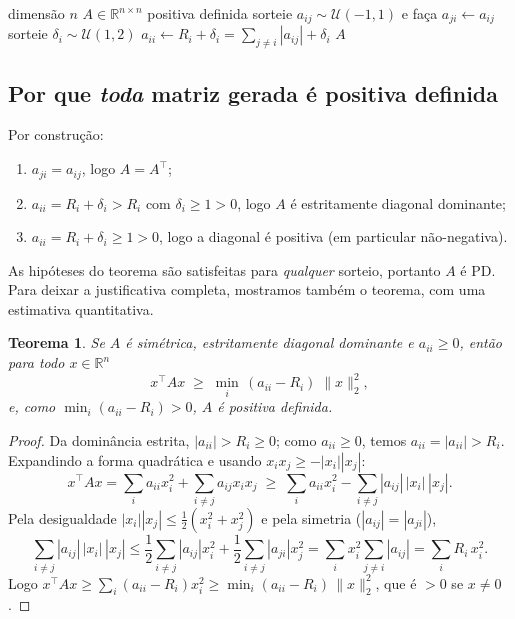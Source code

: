\documentclass{article}
\newcommand{\R}{\mathbb{R}}
\newcommand{\T}{^{\top}}
\newtheorem{teorema}{Teorema}
\theoremstyle{remark}
\begin{document}
\begin{algorithm}[H]
\caption{\texttt{gerar\_matriz\_pd}$(n)$}
\begin{algorithmic}[1]
\Require dimensão $n$
\Ensure $A\in\R^{n\times n}$ positiva definida
    \State sorteie $a_{ij}\sim\mathcal U(-1,1)$ e faça $a_{ji}\gets a_{ij}$ 
  \EndFor
\EndFor
{}
  \State sorteie $\delta_i\sim\mathcal U(1,2)$ 
  \State $a_{ii}\gets R_i+\delta_i=\sum_{j\ne i}|a_{ij}|+\delta_i$
\EndFor
\State \Return $A$
\end{algorithmic}
\end{algorithm}

\subsection{Por que \emph{toda} matriz gerada é positiva definida}
Por construção:
\begin{enumerate}[label=(\roman*)]
  \item $a_{ji}=a_{ij}$, logo $A=A\T$;
  \item $a_{ii}=R_i+\delta_i>R_i$ com $\delta_i\ge 1>0$, logo $A$ é estritamente diagonal dominante;
  \item $a_{ii}=R_i+\delta_i\ge 1>0$, logo a diagonal é positiva (em particular não-negativa).
\end{enumerate}
As hipóteses do teorema são satisfeitas para \emph{qualquer} sorteio, portanto $A$ é PD. Para deixar a
justificativa completa, mostramos também o teorema, com uma estimativa quantitativa.

\begin{teorema}\label{teo:sdd}
Se $A$ é simétrica, estritamente diagonal dominante e $a_{ii}\ge 0$, então para todo $x\in\R^n$
\[
   x\T A x \;\ge\; \min_i\,(a_{ii}-R_i)\;\|x\|_2^2 ,
\]
e, como $\min_i(a_{ii}-R_i)>0$, $A$ é positiva definida.
\end{teorema}
\begin{proof}
Da dominância estrita, $|a_{ii}|>R_i\ge 0$; como $a_{ii}\ge0$, temos $a_{ii}=|a_{ii}|>R_i$.
Expandindo a forma quadrática e usando $x_ix_j\ge -|x_i||x_j|$:
\[
x\T A x=\sum_i a_{ii}x_i^2+\sum_{i\neq j}a_{ij}x_ix_j
\;\ge\;\sum_i a_{ii}x_i^2-\sum_{i\neq j}|a_{ij}|\,|x_i|\,|x_j|.
\]
Pela desigualdade $|x_i||x_j|\le\tfrac12(x_i^2+x_j^2)$ e pela simetria ($|a_{ij}|=|a_{ji}|$),
\[
\sum_{i\neq j}|a_{ij}|\,|x_i|\,|x_j|\le \frac12\sum_{i\ne j}|a_{ij}|x_i^2+\frac12\sum_{i\ne j}|a_{ji}|x_j^2
=\sum_i x_i^2\sum_{j\ne i}|a_{ij}| = \sum_i R_i\,x_i^2 .
\]
Logo $x\T Ax\ge\sum_i (a_{ii}-R_i)x_i^2\ge \min_i(a_{ii}-R_i)\,\|x\|_2^2$, que é $>0$ se $x\neq0$.
\end{proof}
\end{document}
